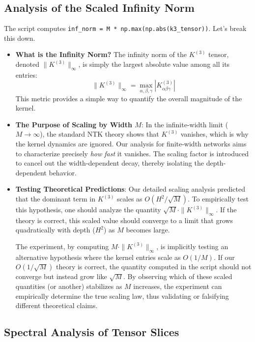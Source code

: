 \documentclass[a4paper]{article}
\begin{document}
\subsection{Analysis of the Scaled Infinity Norm}

The script computes \texttt{inf\_norm = M * np.max(np.abs(k3\_tensor))}. Let's break this down.

\begin{itemize}
    \item \textbf{What is the Infinity Norm?} The infinity norm of the $K^{(3)}$ tensor, denoted $\|K^{(3)}\|_\infty$, is simply the largest absolute value among all its entries:
    \[ \|K^{(3)}\|_\infty = \max_{\alpha, \beta, \gamma} |K^{(3)}_{\alpha\beta\gamma}| \]
    This metric provides a simple way to quantify the overall magnitude of the kernel.

    \item \textbf{The Purpose of Scaling by Width $M$}: In the infinite-width limit ($M \to \infty$), the standard NTK theory shows that $K^{(3)}$ vanishes, which is why the kernel dynamics are ignored. Our analysis for finite-width networks aims to characterize precisely \textit{how fast} it vanishes. The scaling factor is introduced to cancel out the width-dependent decay, thereby isolating the depth-dependent behavior.

    \item \textbf{Testing Theoretical Predictions}: Our detailed scaling analysis predicted that the dominant term in $K^{(3)}$ scales as $O(H^2/\sqrt{M})$. To empirically test this hypothesis, one should analyze the quantity $\sqrt{M} \cdot \|K^{(3)}\|_\infty$. If the theory is correct, this scaled value should converge to a limit that grows quadratically with depth ($H^2$) as $M$ becomes large.

    The experiment, by computing $M \cdot \|K^{(3)}\|_\infty$, is implicitly testing an alternative hypothesis where the kernel entries scale as $O(1/M)$. If our $O(1/\sqrt{M})$ theory is correct, the quantity computed in the script should not converge but instead grow like $\sqrt{M}$. By observing which of these scaled quantities (or another) stabilizes as $M$ increases, the experiment can empirically determine the true scaling law, thus validating or falsifying different theoretical claims.
\end{itemize}

\subsection{Spectral Analysis of Tensor Slices}
\end{document}
